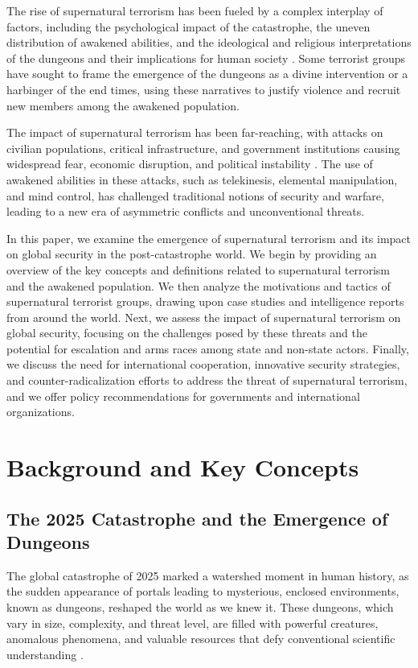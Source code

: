 \documentclass[12pt, a4paper]{article}
\begin{document}
The rise of supernatural terrorism has been fueled by a complex interplay of factors, including the psychological impact of the catastrophe, the uneven distribution of awakened abilities, and the ideological and religious interpretations of the dungeons and their implications for human society \citep{Nakamura2027}. Some terrorist groups have sought to frame the emergence of the dungeons as a divine intervention or a harbinger of the end times, using these narratives to justify violence and recruit new members among the awakened population.

The impact of supernatural terrorism has been far-reaching, with attacks on civilian populations, critical infrastructure, and government institutions causing widespread fear, economic disruption, and political instability \citep{Muller2027}. The use of awakened abilities in these attacks, such as telekinesis, elemental manipulation, and mind control, has challenged traditional notions of security and warfare, leading to a new era of asymmetric conflicts and unconventional threats.

In this paper, we examine the emergence of supernatural terrorism and its impact on global security in the post-catastrophe world. We begin by providing an overview of the key concepts and definitions related to supernatural terrorism and the awakened population. We then analyze the motivations and tactics of supernatural terrorist groups, drawing upon case studies and intelligence reports from around the world. Next, we assess the impact of supernatural terrorism on global security, focusing on the challenges posed by these threats and the potential for escalation and arms races among state and non-state actors. Finally, we discuss the need for international cooperation, innovative security strategies, and counter-radicalization efforts to address the threat of supernatural terrorism, and we offer policy recommendations for governments and international organizations.

\section{Background and Key Concepts}
\subsection{The 2025 Catastrophe and the Emergence of Dungeons}
The global catastrophe of 2025 marked a watershed moment in human history, as the sudden appearance of portals leading to mysterious, enclosed environments, known as dungeons, reshaped the world as we knew it. These dungeons, which vary in size, complexity, and threat level, are filled with powerful creatures, anomalous phenomena, and valuable resources that defy conventional scientific understanding \citep{Sørensen2026}.
\end{document}
